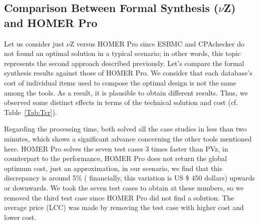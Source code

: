 \documentclass[10pt,journal,compsoc]{IEEEtran}
\begin{document}
\subsection{Comparison Between Formal Synthesis ($\nu$Z) and HOMER Pro}
  
Let us consider just $\nu$Z versus HOMER Pro since ESBMC and CPAchecker do not found an optimal solution in a typical scenario; in other words, this topic represents the second approach described previously. Let's compare the formal synthesis results against those of HOMER Pro. We consider that each database's cost of individual items used to compose the optimal design is not the same among the tools. As a result, it is plausible to obtain different results. Thus, we observed some distinct effects in terms of the technical solution and cost (cf. Table~\ref{Tab:Tcr}). 

Regarding the processing time, both solved all the case studies in less than two minutes, which shows a significant advance concerning the other tools mentioned here. HOMER Pro solves the seven test cases 3 times faster than PVz, in counterpart to the performance, HOMER Pro does not return the global optimum cost, just an approximation, in our scenario, we find that this discrepancy is around 5\% ( financially, this variation is US \$ 450 dollars) upwards or downwards. We took the seven test cases to obtain at these numbers, so we removed the third test case since HOMER Pro did not find a solution. The average price (LCC) was made by removing the test case with higher cost and lower cost.
\end{document}
